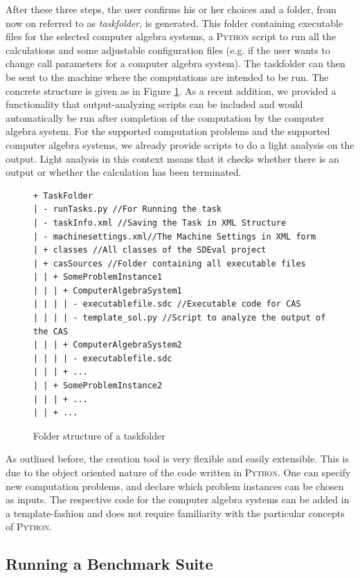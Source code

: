 \documentclass[oribibl,11pt]{article}
\begin{document}
After these three steps, the user confirms his or her choices and a
folder, from now on referred to as \textit{taskfolder}, is
generated. This folder containing executable files for the selected computer
algebra systems, a \textsc{Python} script to run all the calculations
and some adjustable configuration files (e.g. if the user wants to
change call parameters for a computer algebra system). The taskfolder
can then be sent to the machine where the computations are intended to
be run. The concrete
structure is given as in Figure \ref{fgr:TaskFolder}. As a recent
addition, we provided a functionality that output-analyzing scripts can be included and would automatically be run after completion
of the computation by the computer algebra system. For the supported
computation problems and the supported computer algebra systems, we
already provide scripts to do a light analysis on the output. Light analysis in
this context means that it checks whether there is an output or whether the
calculation has been terminated.

\begin{figure}
\caption{Folder structure of a taskfolder}
\label{fgr:TaskFolder}
{\scriptsize{
\begin{verbatim}
+ TaskFolder 
| - runTasks.py //For Running the task
| - taskInfo.xml //Saving the Task in XML Structure
| - machinesettings.xml//The Machine Settings in XML form 
| + classes //All classes of the SDEval project
| + casSources //Folder containing all executable files
| | + SomeProblemInstance1 
| | | + ComputerAlgebraSystem1
| | | | - executablefile.sdc //Executable code for CAS
| | | | - template_sol.py //Script to analyze the output of the CAS
| | | + ComputerAlgebraSystem2
| | | | - executablefile.sdc
| | | + ...
| | + SomeProblemInstance2
| | | + ...
| | + ...
\end{verbatim}}}
\end{figure}


As outlined before, the creation tool is very flexible and easily
extensible. This is due to the object oriented nature of the code
written in \textsc{Python}. One can specify new computation problems,
and declare which problem instances can be chosen as inputs. The
respective code for the computer algebra systems can be added in a
template-fashion and does not require familiarity with the particular
concepts of \textsc{Python}.


\subsection{Running a Benchmark Suite}
\end{document}
